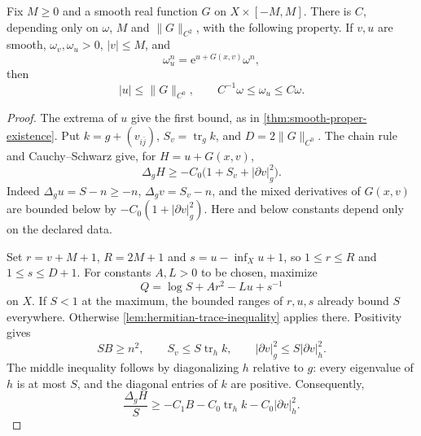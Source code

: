 \begin{lemma}\label{lem:prescribed-potential-trace}
Fix $M\geq0$ and a smooth real function $G$ on $X\times[-M,M]$.
There is $C$, depending only on $\omega$, $M$ and $\|G\|_{C^2}$, with the following property. If $v,u$ are smooth, $\omega_v,\omega_u>0$, $|v|\leq M$, and
\[
 \omega_u^n=\mathrm e^{u+G(x,v)}\omega^n,
\]
then
\[
 |u|\leq\|G\|_{C^0},\qquad C^{-1}\omega\leq\omega_u\leq C\omega.
\]
\end{lemma}
\begin{proof}
The extrema of $u$ give the first bound, as in \cref{thm:smooth-proper-existence}.
Put $k=g+(v_{i\bar j})$, $S_v=\operatorname{tr}_gk$, and $D=2\|G\|_{C^0}$.
The chain rule and Cauchy--Schwarz give, for $H=u+G(x,v)$,
\[
 \Delta_gH\geq-C_0\bigl(1+S_v+|\partial v|_g^2\bigr).
\]
Indeed $\Delta_gu=S-n\geq-n$, $\Delta_gv=S_v-n$, and the mixed derivatives of $G(x,v)$ are bounded below by $-C_0(1+|\partial v|_g^2)$.
Here and below constants depend only on the declared data.

Set $r=v+M+1$, $R=2M+1$ and $s=u-\inf_Xu+1$, so
$1\leq r\leq R$ and $1\leq s\leq D+1$. For constants $A,L>0$ to be chosen, maximize
\[
 Q=\log S+Ar^2-Lu+s^{-1}
\]
on $X$. If $S<1$ at the maximum, the bounded ranges of $r,u,s$ already bound $S$ everywhere. Otherwise \cref{lem:hermitian-trace-inequality} applies there. Positivity gives
\[
 SB\geq n^2,\qquad S_v\leq S\operatorname{tr}_hk,
 \qquad |\partial v|_g^2\leq S|\partial v|_h^2.
\]
The middle inequality follows by diagonalizing $h$ relative to $g$: every eigenvalue of $h$ is at most $S$, and the diagonal entries of $k$ are positive.
Consequently,
\[
 \frac{\Delta_gH}{S}
 \geq-C_1 B-C_0\operatorname{tr}_hk-C_0|\partial v|_h^2.
\]


\end{proof}
